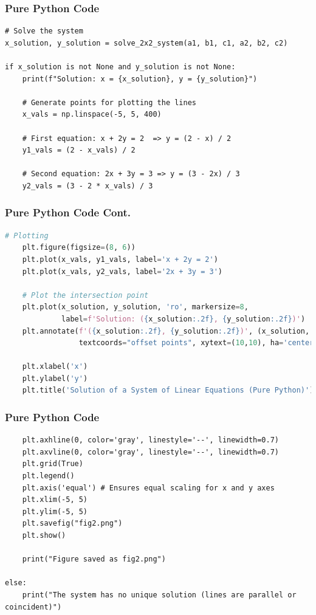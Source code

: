 \documentclass{beamer}
\begin{document}
\begin{frame}[fragile]
\frametitle{Pure Python Code}
\begin{lstlisting}
# Solve the system
x_solution, y_solution = solve_2x2_system(a1, b1, c1, a2, b2, c2)

if x_solution is not None and y_solution is not None:
    print(f"Solution: x = {x_solution}, y = {y_solution}")

    # Generate points for plotting the lines
    x_vals = np.linspace(-5, 5, 400)

    # First equation: x + 2y = 2  => y = (2 - x) / 2
    y1_vals = (2 - x_vals) / 2

    # Second equation: 2x + 3y = 3 => y = (3 - 2x) / 3
    y2_vals = (3 - 2 * x_vals) / 3
\end{lstlisting}
\end{frame}

\begin{frame}[fragile]
\frametitle{Pure Python Code Cont.}
\begin{lstlisting}[language=Python]
    # Plotting
    plt.figure(figsize=(8, 6))
    plt.plot(x_vals, y1_vals, label='x + 2y = 2')
    plt.plot(x_vals, y2_vals, label='2x + 3y = 3')

    # Plot the intersection point
    plt.plot(x_solution, y_solution, 'ro', markersize=8, 
             label=f'Solution: ({x_solution:.2f}, {y_solution:.2f})')
    plt.annotate(f'({x_solution:.2f}, {y_solution:.2f})', (x_solution, y_solution),
                 textcoords="offset points", xytext=(10,10), ha='center')

    plt.xlabel('x')
    plt.ylabel('y')
    plt.title('Solution of a System of Linear Equations (Pure Python)')
    \end{lstlisting}
\end{frame}

\begin{frame}[fragile]
\frametitle{Pure Python Code}
\begin{lstlisting}
    plt.axhline(0, color='gray', linestyle='--', linewidth=0.7)
    plt.axvline(0, color='gray', linestyle='--', linewidth=0.7)
    plt.grid(True)
    plt.legend()
    plt.axis('equal') # Ensures equal scaling for x and y axes
    plt.xlim(-5, 5)
    plt.ylim(-5, 5)
    plt.savefig("fig2.png")
    plt.show()

    print("Figure saved as fig2.png")

else:
    print("The system has no unique solution (lines are parallel or coincident)")
\end{lstlisting}
\end{frame}
\end{document}
